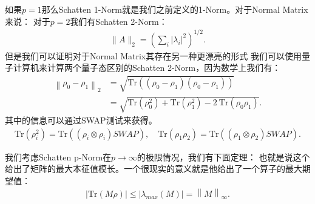 如果$ p = 1 $那么Schatten 1-Norm就是我们之前定义的1-Norm。对于Normal Matrix来说：
对于$ p = 2 $我们有Schatten 2-Norm：
\begin{align}
  \lVert A\rVert_2=\left(\sum_i\lvert\lambda_i\rvert^2\right)^{1/2}.
\end{align}
但是我们可以证明对于Normal Matrix其存在另一种更漂亮的形式
我们可以使用量子计算机来计算两个量子态区别的Schatten 2-Norm，因为数学上我们有：
\begin{align}
  \left\|\rho_0-\rho_1\right\|_2&=\sqrt{\mathrm{Tr}((\rho_0-\rho_1)(\rho_0-\rho_1))}\\
  &=\sqrt{\mathrm{Tr}(\rho_0^2)+\mathrm{Tr}(\rho_1^2)-2\mathrm{~Tr}(\rho_0\rho_1)}.
\end{align}
其中的信息可以通过SWAP测试来获得。
\begin{align}
  \mathrm{Tr}\left(\rho_i^2\right)=\mathrm{Tr}((\rho_i\otimes\rho_i)SWAP),\quad\mathrm{Tr}(\rho_1\rho_2)=\mathrm{Tr}((\rho_1\otimes\rho_2)SWAP).
\end{align}

\bigskip
{}

我们考虑Schatten p-Norm在$ p\to\infty $的极限情况，我们有下面定理：
也就是说这个给出了矩阵的最大本征值模长。一个很现实的意义就是他给出了一个算子的最大期望值：
\begin{align}
  \left|\mathrm{Tr}(M\rho)\right|\leq\left|\lambda_{max}(M)\right|=\left\|M\right\|_\infty.
\end{align}
